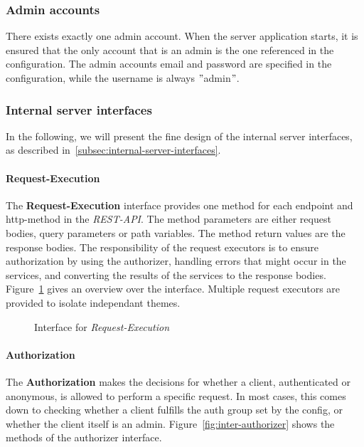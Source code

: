 \subsubsection{Admin accounts}
There exists exactly one admin account.
When the server application starts, it is ensured that the only account that is an admin is the one referenced in the configuration.
The admin accounts email and password are specified in the configuration, while the username is always \("\)admin\("\).

\subsubsection{Internal server interfaces}
In the following, we will present the fine design of the internal server interfaces, as described in~\ref{subsec:internal-server-interfaces}.

\paragraph{Request-Execution}
The \textbf{Request-Execution} interface provides one method for each endpoint and http-method in the \textit{REST-API}.
The method parameters are either request bodies, query parameters or path variables.
The method return values are the response bodies.\newline
The responsibility of the request executors is to ensure authorization by using the authorizer, handling errors that might occur in the services, and converting the results of the services to the response bodies.
Figure~\ref{fig:inter-executors} gives an overview over the interface.
Multiple request executors are provided to isolate independant themes.

\begin{figure}
    \centering

    \caption{Interface for \textit{Request-Execution}}
    \label{fig:inter-executors}
\end{figure}

\paragraph{Authorization}
The \textbf{Authorization} makes the decisions for whether a client, authenticated or anonymous, is allowed to perform a specific request. \newline
In most cases, this comes down to checking whether a client fulfills the auth group set by the config, or whether the client itself is an admin.
Figure~\ref{fig:inter-authorizer} shows the methods of the authorizer interface.

